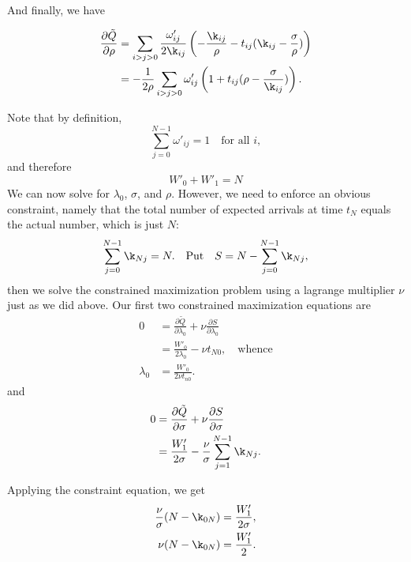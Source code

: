 \documentclass[12pt,leqno]{article}
\begin{document}
And finally, we have

\begin{equation}\label{dQ_drho}
\begin{split}
\frac{\partial\tilde{Q}}{\partial\rho} &= 
 \sum_{i>j>0}\frac{\omega'_{ij}}{2\k_{ij}}\left(-\frac{\k_{ij}}{\rho} -t_{ij}(\k_{ij} - \frac{\sigma}{\rho})\right)\\
&= -\frac{1}{2\rho}\sum_{i>j>0}\omega'_{ij}\left(1 + t_{ij}(\rho - \frac{\sigma}{\k_{ij}})\right).
\end{split}
\end{equation}

Note that by definition,
$$
\sum_{j=0}^{N-1}\omega'_{ij} = 1\quad\text{for all } i,
$$
and therefore
\begin{equation}\label{W0+W1}
  W'_0 + W'_1 = N
\end{equation}
We can now solve for $\lambda_0$, $\sigma$, and $\rho$.  However, we
need to enforce an obvious constraint, namely that
the total number of expected arrivals at time $t_N$ equals the
actual number, which is just $N$:
$$
\sum_{j=0}^{N-1}\k_{Nj} = N.\quad\text{Put}\quad
S = N - \sum_{j=0}^{N-1}\k_{Nj},
$$
then we solve the constrained maximization problem using a lagrange multiplier $\nu$ just as we did above. Our first two constrained maximization equations are
\begin{equation}\label{eq1}
  \begin{split}
    0 &= \frac{\partial\tilde{Q}}{\partial\lambda_0} + \nu\frac{\partial{S}}{\partial\lambda_0} \\
    &=  \frac{W'_0}{2\lambda_0} - {\nu}t_{N0},\quad\text{whence}\\
    \lambda_0 &= \frac{W'_0}{2\nu{t_{n0}}}.
  \end{split}
\end{equation}
and
\begin{equation}\label{eq2}
  \begin{split}
    0 &= \frac{\partial\tilde{Q}}{\partial\sigma} + \nu\frac{\partial{S}}{\partial\sigma} \\
    &= \frac{W'_1}{2\sigma}-
    \frac{\nu}{\sigma}\sum_{j=1}^{N-1}\k_{Nj}.
  \end{split}
\end{equation}

Applying the constraint equation, we get
\begin{align*}
      \frac{\nu}{\sigma}(N-\k_{0N}) &= \frac{W'_1}{2\sigma},\\
      \nu(N-\k_{0N}) &= \frac{W'_1}{2}.
  \end{align*}
\end{document}

